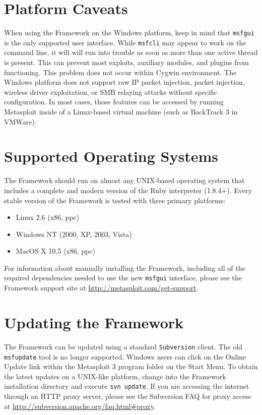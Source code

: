 \documentclass{report}
\begin{document}
    \section{Platform Caveats}
    \label{INSTALL-CAVEAT}

\par
When using the Framework on the Windows platform, keep in mind that \texttt{msfgui} is the only
supported user interface. While \texttt{msfcli} may appear to work on the command line, it will will run into
trouble as soon as more than one active thread is present. This can prevent most exploits, auxiliary modules,
and plugins from functioning. This problem does not occur within Cygwin environment. The Windows platform does
not support raw IP packet injection, packet injection, wireless driver exploitation, or SMB relaying attacks
without specific configuration. In most cases, those features can be accessed by running Metasploit inside of a
Linux-based virtual machine (such as BackTrack 3 in VMWare).

    \section{Supported Operating Systems}
    \label{INSTALL-SUPPORT}

\par
The Framework should run on almost any UNIX-based operating system that includes
a complete and modern version of the Ruby interpreter (1.8.4+). Every stable
version of the Framework is tested with three primary platforms:

\begin{itemize}
\item Linux 2.6 (x86, ppc)
\item Windows NT (2000, XP, 2003, Vista)
\item MacOS X 10.5 (x86, ppc)
\end{itemize}

\par
For information about manually installing the Framework, including all of the required
dependencies needed to use the new \texttt{msfgui} interface, please see the Framework
support site at \url{http://metasploit.com/get-support}.

    \section{Updating the Framework}
    \label{INSTALL-UPDATE}

\par
The Framework can be updated using a standard \texttt{Subversion} client. The
old \texttt{msfupdate} tool is no longer supported. Windows users can click on
the Online Update link within the Metasploit 3 program folder on the Start Menu.
To obtain the latest updates on a UNIX-like platform, change into the Framework
installation directory and execute \texttt{svn update}. If you are accessing the
internet through an HTTP proxy server, please see the Subversion FAQ for proxy
access at \url{http://subversion.apache.org/faq.html#proxy}.
\end{document}
